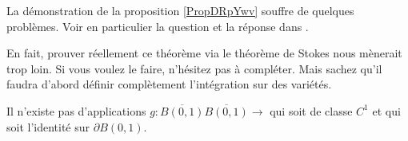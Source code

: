 \begin{probleme}    \label{PROBooSSOBooCsovCy}
	La démonstration de la proposition \ref{PropDRpYwv} souffre de quelques problèmes. Voir en particulier la question et la réponse dans \cite{BIBooIDAGooAbmLcf}.

	En fait, prouver réellement ce théorème via le théorème de Stokes nous mènerait trop loin. Si vous voulez le faire, n'hésitez pas à compléter. Mais sachez qu'il faudra d'abord définir complètement l'intégration sur des variétés.
\end{probleme}


\begin{proposition}	\label{PROPooBRZCooLvscEf}
	Il n'existe pas d'applications \(g \colon \overline{B(0,1)}\overline{B(0,1)}\to   \) qui soit de classe \( C^1\) et qui soit l'identité sur \( \partial B(0,1)\).
\end{proposition}

